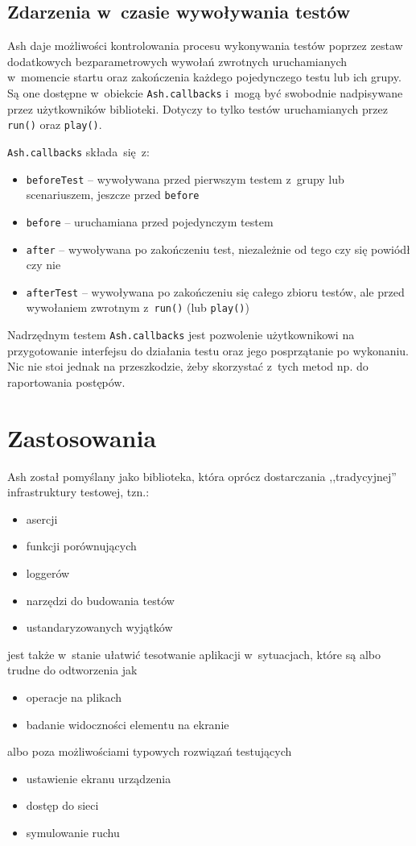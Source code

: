 \documentclass[brudnopis]{xmgr}
\begin{document}
\section{Zdarzenia w~czasie wywoływania testów}

Ash daje możliwości kontrolowania procesu wykonywania testów poprzez zestaw dodatkowych bezparametrowych wywołań zwrotnych uruchamianych w~momencie startu oraz zakończenia każdego pojedynczego testu lub ich grupy. Są one dostępne w~obiekcie \texttt{Ash.callbacks} i~mogą być swobodnie nadpisywane przez użytkowników biblioteki. Dotyczy to tylko testów uruchamianych przez \texttt{run()} oraz \texttt{play()}.

\texttt{Ash.callbacks} składa~się~z:

\begin{itemize}
  \item \texttt{beforeTest} -- wywoływana przed pierwszym testem z~grupy lub scenariuszem, jeszcze przed \texttt{before}
  \item \texttt{before} -- uruchamiana przed pojedynczym testem
  \item \texttt{after} -- wywoływana po zakończeniu test, niezależnie od tego czy się powiódł czy nie
  \item \texttt{afterTest} -- wywoływana po zakończeniu się całego zbioru testów, ale przed wywołaniem zwrotnym z~\texttt{run()} (lub \texttt{play()}) 
\end{itemize}

Nadrzędnym testem \texttt{Ash.callbacks} jest pozwolenie użytkownikowi na przygotowanie interfejsu do działania testu oraz jego posprzątanie po wykonaniu. Nic nie stoi jednak na przeszkodzie, żeby skorzystać z~tych metod np. do raportowania postępów.

\chapter{Zastosowania}
Ash został pomyślany jako biblioteka, która oprócz dostarczania ,,tradycyjnej'' infrastruktury testowej, tzn.:
\begin{itemize}
  \item asercji
  \item funkcji porównujących
  \item loggerów
  \item narzędzi do budowania testów
  \item ustandaryzowanych wyjątków
\end{itemize}
jest także w~stanie ułatwić tesotwanie aplikacji w~sytuacjach, które są albo trudne do odtworzenia jak
\begin{itemize}
  \item operacje na plikach
  \item badanie widoczności elementu na ekranie
\end{itemize}
 albo poza możliwościami typowych rozwiązań testujących
\begin{itemize}
  \item ustawienie ekranu urządzenia
  \item dostęp do sieci
  \item symulowanie ruchu
\end{itemize}
\end{document}
